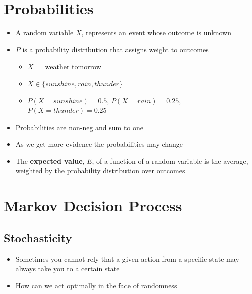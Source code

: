 \documentclass[11pt]{article}
\begin{document}
\section{Probabilities}
\label{sec:org24bb434}
\begin{itemize}
\item A random variable \(X\), represents an event whose outcome is unknown
\item \(P\) is a probability distribution that assigns weight to outcomes
\begin{itemize}
\item \(X=\) weather tomorrow
\item \(X \in \{sunshine, rain, thunder\}\)
\item \(P(X=sunshine)=0.5\), \(P(X=rain) = 0.25\), \(P(X=thunder) = 0.25\)
\end{itemize}
\item Probabilities are non-neg and sum to one
\item As we get more evidence the probabilities may change
\item The \textbf{expected value}, \(E\), of a function of a random variable is the average, weighted by the probability distribution over outcomes
\end{itemize}
\section{Markov Decision Process}
\label{sec:orgcd64e13}
\subsection{Stochasticity}
\label{sec:org1c177f8}
\begin{itemize}
\item Sometimes you cannot rely that a given action from a specific state may always take you to a certain state
\item How can we act optimally in the face of randomness
\end{itemize}
\end{document}
